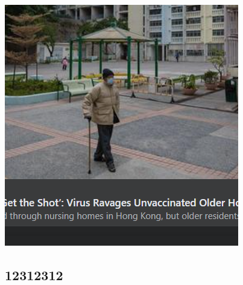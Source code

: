 \documentclass[fontsize=13pt,oneside,a4paper,openany]{vietkey.luanan.1.2}
\begin{document}
\includegraphics[scale=1]{oGA08}

\subsection{12312312}


\VKmucLuc				%


\VKdanhMucHinhVe		%
\VKdanhMucBangBieu		%
\VKbatDaudanhSo			%


\VKngatTrang			%
\VKtaiLieuThamKhao		%
\VKdanhSoPhuLuc			%

\end{document}
